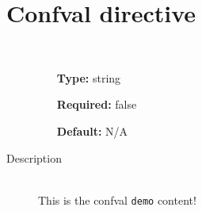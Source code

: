 \documentclass[11pt]{report}
\begin{document}
\label{}
    \section{Confval directive}

    \begin{description}
    \item[\textttdemo]
    \hfill \\
    \begin{itemize}
        \item[\textbf{Type:}] string
        \item[\textbf{Required:}] false        \item[\textbf{Default:}] N/A\end{itemize}

    \item[Description]
    \hfill \\
This is the confval \texttt{demo} content!
\end{description}
\end{document}
